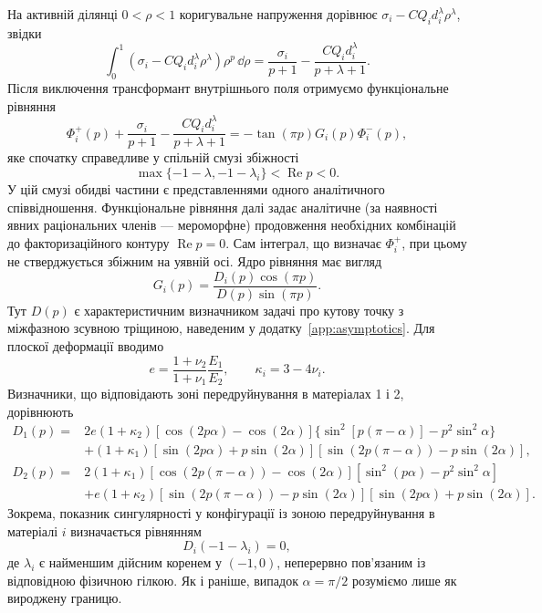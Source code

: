 На активній ділянці $0<\rho<1$ коригувальне напруження дорівнює
$\sigma_i-CQ_i d_i^\lambda\rho^\lambda$, звідки
\begin{equation*}
  \int_0^1
  \left(\sigma_i-CQ_i d_i^\lambda\rho^\lambda\right)
  \rho^p\,\dd\rho
  =
  \frac{\sigma_i}{p+1}
  -\frac{CQ_i d_i^\lambda}{p+\lambda+1}.
\end{equation*}
Після виключення трансформант внутрішнього поля отримуємо функціональне
рівняння
\begin{equation}
\label{eq:wiener-hopf-functional}
  \Phi_i^+(p)
  +\frac{\sigma_i}{p+1}
  -\frac{CQ_i d_i^\lambda}{p+\lambda+1}
  =-\tan(\pi p)G_i(p)\Phi_i^-(p),
\end{equation}
яке спочатку справедливе у спільній смузі збіжності
\begin{equation*}
  \max\{-1-\lambda,-1-\lambda_i\}
  <\operatorname{Re}p<0.
\end{equation*}
У цій смузі обидві частини є представленнями одного аналітичного
співвідношення. Функціональне рівняння далі задає аналітичне
(за наявності явних раціональних членів --- мероморфне) продовження
необхідних комбінацій до факторизаційного контуру
$\operatorname{Re}p=0$. Сам інтеграл, що визначає $\Phi_i^+$, при цьому
не стверджується збіжним на уявній осі. Ядро рівняння має
вигляд
\begin{equation*}
  G_i(p)=\frac{D_i(p)\cos(\pi p)}{D(p)\sin(\pi p)}.
\end{equation*}
Тут $D(p)$ є характеристичним визначником задачі про кутову точку з
міжфазною зсувною тріщиною, наведеним у додатку~\ref{app:asymptotics}.
Для плоскої деформації вводимо
\begin{equation*}
  e=\frac{1+\nu_2}{1+\nu_1}\frac{E_1}{E_2},
  \qquad
  \kappa_i=3-4\nu_i.
\end{equation*}
Визначники, що відповідають зоні передруйнування в матеріалах 1 і 2,
дорівнюють
\begin{equation*}
\begin{aligned}
  D_1(p)={}&2e(1+\kappa_2)
    [\cos(2p\alpha)-\cos(2\alpha)]
    \{\sin^2[p(\pi-\alpha)]-p^2\sin^2\alpha\}\\
  &+(1+\kappa_1)
    [\sin(2p\alpha)+p\sin(2\alpha)]
    [\sin(2p(\pi-\alpha))-p\sin(2\alpha)],\\[2pt]
  D_2(p)={}&2(1+\kappa_1)
    [\cos(2p(\pi-\alpha))-\cos(2\alpha)]
    [\sin^2(p\alpha)-p^2\sin^2\alpha]\\
  &+e(1+\kappa_2)
    [\sin(2p(\pi-\alpha))-p\sin(2\alpha)]
    [\sin(2p\alpha)+p\sin(2\alpha)].
\end{aligned}
\end{equation*}
Зокрема, показник сингулярності у конфігурації із зоною
передруйнування в матеріалі $i$ визначається рівнянням
\begin{equation*}
  D_i(-1-\lambda_i)=0,
\end{equation*}
де $\lambda_i$ є найменшим дійсним коренем у $(-1,0)$, неперервно
пов'язаним із відповідною фізичною гілкою. Як і раніше, випадок
$\alpha=\pi/2$ розуміємо лише як вироджену границю.

